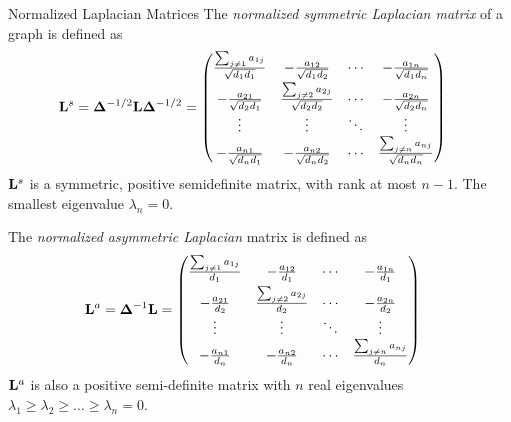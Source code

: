 \begin{frame}{Normalized Laplacian Matrices}
  \small
The {\em normalized
symmetric Laplacian matrix} of a graph is def\/{i}ned as
\begin{align*}
    \bL^s & = \bDelta^{-1/2}\bL\bDelta^{-1/2}
          =    \matr{
     {\sum_{j\ne1} a_{1j} \over \sqrt{d_1d_1}} & -{a_{12} \over
     \sqrt{d_1d_2}} & \cdots & -{a_{1n} \over \sqrt{d_1d_n}}
     \\[1ex]
     -{a_{21} \over \sqrt{d_2d_1}} & {\sum_{j\ne2}a_{2j} \over
     \sqrt{d_2d_2}} & \cdots & -{a_{2n} \over \sqrt{d_2d_n}} \\
      \vdots & \vdots & \ddots & \vdots\\
      -{a_{n1} \over \sqrt{d_nd_1}} & -{a_{n2} \over
      \sqrt{d_nd_2}} & \cdots & {\sum_{j\ne n}a_{nj} \over
      \sqrt{d_nd_n}} \\
      } 
\end{align*}
$\mathbf{L}^s$ is a symmetric, positive semidef\/{i}nite matrix, with 
rank at most $n-1$. The
smallest eigenvalue $\lambda_n = 0$.

The {\em normalized asymmetric Laplacian} matrix is def\/{i}ned as
\begin{align*}
    \bL^a &= \bDelta^{-1} \bL
     = \matr{
    {\sum_{j\ne1} a_{1j} \over d_1} & -{a_{12} \over d_1} &
    \cdots & -{a_{1n} \over d_1} \\[1ex]
    -{a_{21}\over d_2} & {\sum_{j\ne2} a_{2j} \over d_2}
    & \cdots & -{a_{2n} \over d_2}\\
      \vdots & \vdots & \ddots & \vdots\\
      -{a_{n1} \over d_n} & -{a_{n2} \over d_n} &\cdots
      & {\sum_{j\ne n} a_{nj} \over d_n} \\
    }
\end{align*}
$\mathbf{L}^a$ is also a
positive semi-def\/{i}nite matrix with $n$ real eigenvalues $\lambda_1
\ge \lambda_2 \ge \dots \ge \lambda_n = 0$.
\end{frame}




